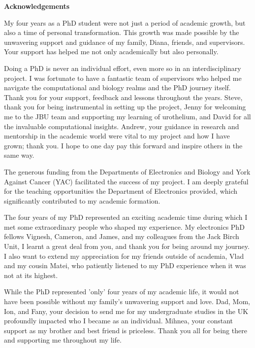 \thispagestyle{plain}
\begin{center}
    \Large        
    \textbf{Acknowledgements}
    \vspace{0.9cm}

\end{center}
 

My four years as a PhD student were not just a period of academic growth, but also a time of personal transformation. This growth was made possible by the unwavering support and guidance of my family, Diana, friends, and supervisors. Your support has helped me not only academically but also personally.

Doing a PhD is never an individual effort, even more so in an interdisciplinary project. I was fortunate to have a fantastic team of supervisors who helped me navigate the computational and biology realms and the PhD journey itself. Thank you for your support, feedback and lessons throughout the years. Steve, thank you for being instrumental in setting up the project, Jenny for welcoming me to the JBU team and supporting my learning of urothelium, and David for all the invaluable computational insights. Andrew, your guidance in research and mentorship in the academic world were vital to my project and how I have grown; thank you. I hope to one day pay this forward and inspire others in the same way.

The generous funding from the Departments of Electronics and Biology and York Against Cancer (YAC) facilitated the success of my project. I am deeply grateful for the teaching opportunities the Department of Electronics provided, which significantly contributed to my academic formation.

The four years of my PhD represented an exciting academic time during which I met some extraordinary people who shaped my experience. My electronics PhD fellows Vignesh, Cameron, and James, and my colleagues from the Jack Birch Unit, I learnt a great deal from you, and thank you for being around my journey. I also want to extend my appreciation for my friends outside of academia, Vlad and my cousin Matei, who patiently listened to my PhD experience when it was not at its highest.

While the PhD represented 'only' four years of my academic life, it would not have been possible without my family's unwavering support and love. Dad, Mom, Ion, and Fany, your decision to send me for my undergraduate studies in the UK profoundly impacted who I became as an individual. Mihnea, your constant support as my brother and best friend is priceless. Thank you all for being there and supporting me throughout my life.

